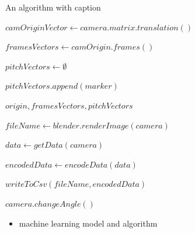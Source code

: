 \documentclass[
11pt,
twoside
]{report}
\begin{document}
\begin{algorithm}
\begin{algorithmic}


\caption{An algorithm with caption}\label{alg:cap}

\State


    \State $camOriginVector \gets camera.matrix.translation()$

    \State $framesVectors \gets camOrigin.frames()$

    \State $pitchVectors \gets \emptyset$

        \State $pitchVectors.append(marker)$
    \EndFor

    \Return $origin, framesVectors, pitchVectors$
\EndProcedure

\State

    \State $fileName \gets blender.renderImage(camera)$
\EndFor

\State

\State $data \gets getData(camera)$

\State $encodedData \gets encodeData(data)$

\State $writeToCsv(fileName, encodedData)$

\State $camera.changeAngle()$

\end{algorithmic}
\end{algorithm}


\begin{itemize}
\item
  machine learning model and algorithm
\end{itemize}
\end{document}
